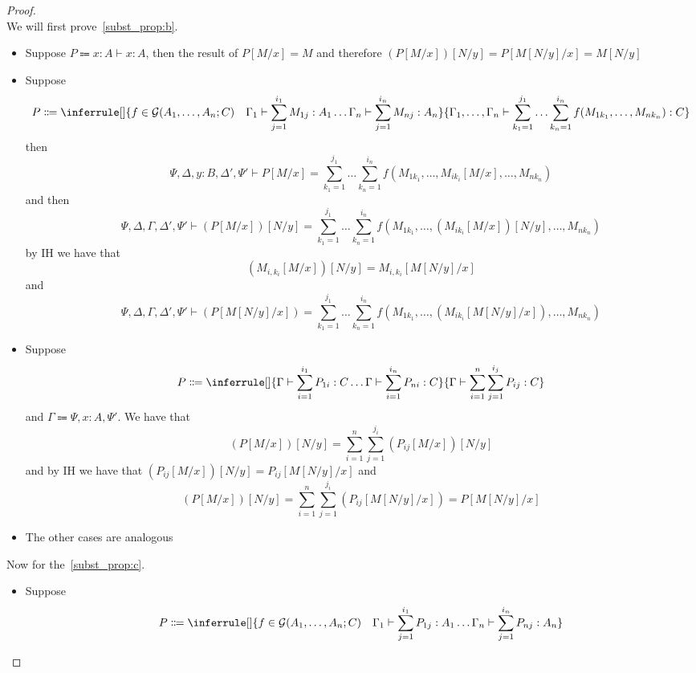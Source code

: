 \documentclass[acmsmall,screen, nonacm, anonymous]{acmart}
\begin{document}
\begin{proof}
  \leavevmode\\
  We will first prove~\autoref{subst_prop:b}.
  \begin{itemize}
    \item Suppose $P \Coloneqq x : A \vdash x : A$, then the result of $P[M/x] = M$ and therefore $(P[M/x])[N / y] = P[M[N/y]/x] = M[N/y]$
    \item Suppose 
    \begin{gather*}
      P \Coloneqq \inferrule[]{
        f \in \mathcal{G}(A_1, \ldots, A_n;C) \quad \Gamma_1 \vdash \sum_{j=1}^{i_1} M_{1j} : A_1 \ldots \Gamma_n \vdash \sum_{j=1}^{i_n}M_{nj} : A_n
        }{
          \Gamma_1, \ldots, \Gamma_n \vdash \sum_{k_1=1}^{j_1}\ldots\sum_{k_n=1}^{i_n}f(M_{1k_1},\ldots,M_{nk_{n}}): C
        }
    \end{gather*}
    then 
    \[
    \Psi, \Delta, y : B, \Delta', \Psi' \vdash P[M/x] = \sum_{k_1=1}^{j_1}\ldots\sum_{k_n=1}^{i_n}f(M_{1k_1},\ldots, M_{ik_i}[M/x] ,\ldots,M_{nk_{n}})
    \]
    and then 
    \[
    \Psi,\Delta,\Gamma,\Delta',\Psi' \vdash (P[M/x])[N/y] = \sum_{k_1=1}^{j_1}\ldots\sum_{k_n=1}^{i_n}f(M_{1k_1},\ldots, (M_{ik_i}[M/x])[N/y] ,\ldots,M_{nk_{n}})
    \]
    by IH we have that
    \[
      (M_{i,k_i}[M/x])[N/y] = M_{i,k_i}[M[N/y]/x]
    \]
    and
    \[
      \Psi,\Delta,\Gamma,\Delta',\Psi' \vdash (P[M[N/y]/x]) = \sum_{k_1=1}^{j_1}\ldots\sum_{k_n=1}^{i_n}f(M_{1k_1},\ldots, (M_{ik_i}[M[N/y] / x]) ,\ldots,M_{nk_{n}})
    \]
    \item Suppose 
    \begin{gather*}
    P \Coloneqq \inferrule[]{\Gamma \vdash \sum_{i=1}^{i_1}P_{1i} : C \ldots \Gamma \vdash \sum_{i=1}^{i_n}P_{ni} : C}{\Gamma \vdash \sum_{i=1}^{n}\sum_{j=1}^{i_j}P_{ij} : C}
    \end{gather*}
    and $\Gamma \Coloneqq \Psi, x : A, \Psi'$.
    We have that 
    \[
    (P[M/x])[N/y] = \sum_{i=1}^{n}\sum_{j=1}^{j_i}(P_{ij}[M/x])[N/y]
    \] 
    and by IH we have that $(P_{ij}[M/x])[N/y] = P_{ij}[M[N/y]/x]$ and
    \[
      (P[M/x])[N/y] = \sum_{i=1}^{n}\sum_{j=1}^{j_i}(P_{ij}[M[N/y]/x]) = P[M[N/y]/x]
    \]
    \item The other cases are analogous
  \end{itemize}
  Now for the~\autoref{subst_prop:c}.
  \begin{itemize}
    \item Suppose
      \begin{gather*}
        P \Coloneqq \inferrule[]{
          f \in \mathcal{G}(A_1, \ldots, A_n;C) \quad \Gamma_1 \vdash \sum_{j=1}^{i_1} P_{1j} : A_1 \ldots \Gamma_n \vdash \sum_{j=1}^{i_n}P_{nj} : A_n
}
\end{gather*}
\end{itemize}
\end{proof}
\end{document}
